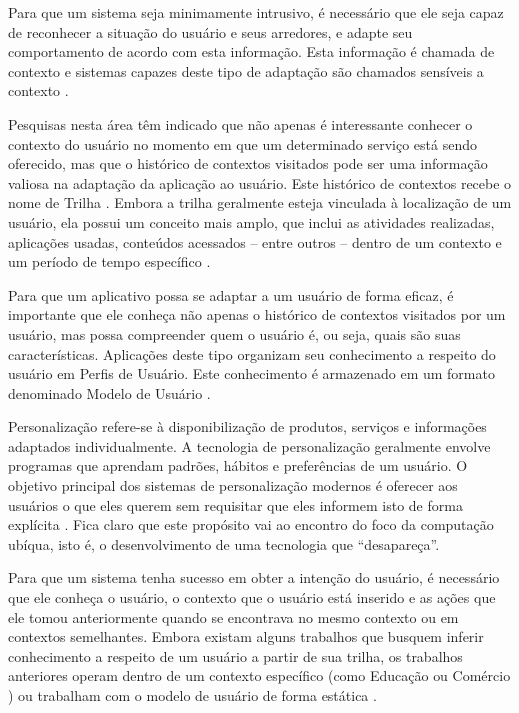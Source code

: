\documentclass[times, 10pt, twocolumn]{article}
\begin{document}
Para que um sistema seja minimamente intrusivo, é necessário que ele seja capaz de reconhecer a situação do usuário e seus arredores, e adapte seu comportamento de acordo com esta informação. Esta informação é chamada de contexto e sistemas capazes deste tipo de adaptação são chamados sensíveis a contexto \cite{satyanarayanan01,dey2001}. 

Pesquisas nesta área têm indicado que não apenas é interessante conhecer o contexto do usuário no momento em que um determinado serviço está sendo oferecido, mas que o histórico de contextos visitados pode ser uma informação valiosa na adaptação da aplicação ao usuário. Este histórico de contextos recebe o nome de Trilha \cite{silva10}. Embora a trilha geralmente esteja vinculada à localização de um usuário, ela possui um conceito mais amplo, que inclui as atividades realizadas, aplicações usadas, conteúdos acessados -- entre outros -- dentro de um contexto e um período de tempo específico \cite{silva09}.

Para que um aplicativo possa se adaptar a um usuário de forma eficaz, é importante que ele conheça não apenas o histórico de contextos visitados por um usuário, mas possa compreender quem o usuário é, ou seja, quais são suas características. Aplicações deste tipo organizam seu conhecimento a respeito do usuário em Perfis de Usuário. Este conhecimento é armazenado em um formato denominado Modelo de Usuário \cite{viviani10}.

Personalização refere-se à disponibilização de produtos, serviços e informações adaptados individualmente. A tecnologia de personalização geralmente envolve programas que aprendam padrões, hábitos e preferências de um usuário. O objetivo principal dos sistemas de personalização modernos é oferecer aos usuários o que eles querem sem requisitar que eles informem isto de forma explícita \cite{mulvenna00}. Fica claro que este propósito vai ao encontro do foco da computação ubíqua, isto é, o desenvolvimento de uma tecnologia que ``desapareça''.

Para que um sistema tenha sucesso em obter a intenção do usuário, é necessário que ele conheça o usuário, o contexto que o usuário está inserido e as ações que ele tomou anteriormente quando se encontrava no mesmo contexto ou em contextos semelhantes. Embora existam alguns trabalhos que busquem inferir conhecimento a respeito de um usuário a partir de sua trilha, os trabalhos anteriores operam dentro de um contexto específico (como Educação \cite{barbosa11} ou Comércio \cite{franco11}) ou trabalham com o modelo de usuário de forma estática \cite{pelep}.
\end{document}
